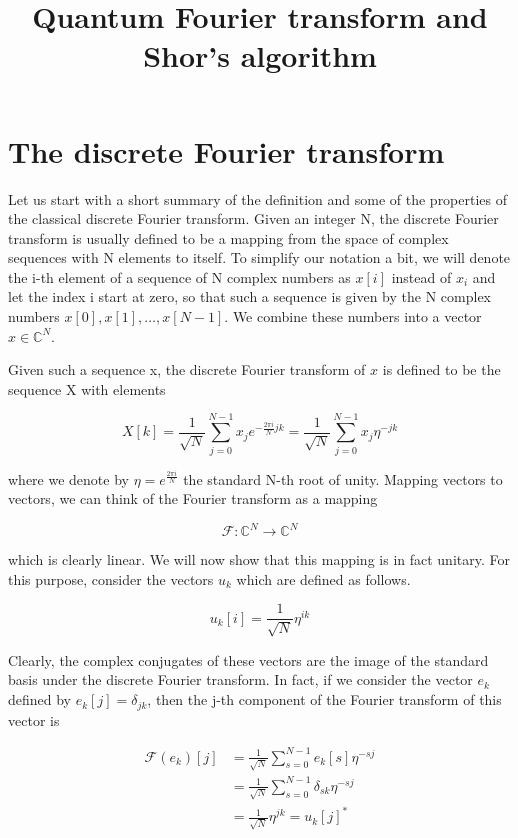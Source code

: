 \documentclass[a4paper, draft]{article}
\title{Quantum Fourier transform and Shor's algorithm}
\theoremstyle{own}
\theoremstyle{remark}
\newcommand{\C}{\mathbb{C}}
\begin{document}
\maketitle



\section{The discrete Fourier transform}

Let us start with a short summary of the definition and some of the properties of the classical discrete Fourier transform. Given an integer N, the discrete Fourier transform is usually defined to be a mapping from the space of complex sequences with N elements to itself. To simplify our notation a bit, we will denote the i-th element of a sequence of N complex numbers as $x[i]$ instead of $x_i$ and let the index i start at zero, so that such a sequence is given by the N complex numbers $x[0], x[1], \dots, x[N-1]$. We combine these numbers into a vector $x \in \C^N$. 

Given such a sequence x, the discrete Fourier transform of $x$ is defined to be the sequence X with elements

$$
X[k] = \frac{1}{\sqrt{N}} \sum_{j=0}^{N-1} x_j e^{-\frac{2\pi i}{N} jk} = \frac{1}{\sqrt{N}} \sum_{j=0}^{N-1} x_j \eta^{-jk}
$$

where we denote by $\eta = e^{\frac{2\pi i}{N}}$ the standard N-th root of unity. Mapping vectors to vectors, we can think of the Fourier transform as a mapping

$$
\mathcal{F} \colon \C^N \rightarrow \C^N
$$

which is clearly linear. We will now show that this mapping is in fact unitary. For this purpose, consider the vectors $u_k$ which are defined as follows.

$$
u_k[i] = \frac{1}{\sqrt{N}} \eta^{ik}
$$

Clearly, the complex conjugates of these vectors are the image of the standard basis under the discrete Fourier transform. In fact, if we consider the vector $e_k$ defined by $e_k[j] = \delta_{jk}$, then the j-th component of the Fourier transform of this vector is

\begin{align*}
\mathcal{F}(e_k)[j] & = \frac{1}{\sqrt{N}}  \sum_{s=0}^{N-1} e_k[s] \eta^{-sj} \\
& = \frac{1}{\sqrt{N}}  \sum_{s=0}^{N-1} \delta_{sk} \eta^{-sj} \\
&= \frac{1}{\sqrt{N}} \eta^{jk} = u_k[j]^*
\end{align*}
\end{document}
